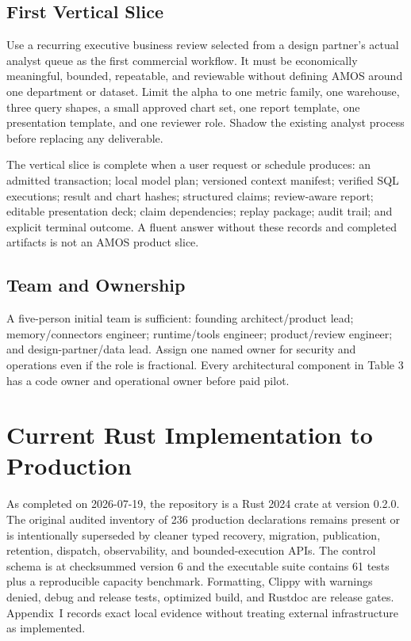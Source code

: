 \documentclass[10pt]{article}
\begin{document}
\subsection{First Vertical Slice}

Use a recurring executive business review selected from a design partner's actual analyst queue as the first commercial workflow. It must be economically meaningful, bounded, repeatable, and reviewable without defining AMOS around one department or dataset. Limit the alpha to one metric family, one warehouse, three query shapes, a small approved chart set, one report template, one presentation template, and one reviewer role. Shadow the existing analyst process before replacing any deliverable.

The vertical slice is complete when a user request or schedule produces: an admitted transaction; local model plan; versioned context manifest; verified SQL executions; result and chart hashes; structured claims; review-aware report; editable presentation deck; claim dependencies; replay package; audit trail; and explicit terminal outcome. A fluent answer without these records and completed artifacts is not an AMOS product slice.

\subsection{Team and Ownership}

A five-person initial team is sufficient: founding architect/product lead; memory/connectors engineer; runtime/tools engineer; product/review engineer; and design-partner/data lead. Assign one named owner for security and operations even if the role is fractional. Every architectural component in Table 3 has a code owner and operational owner before paid pilot.

\section{Current Rust Implementation to Production}

As completed on 2026-07-19, the repository is a Rust 2024 crate at version 0.2.0. The original audited inventory of 236 production declarations remains present or is intentionally superseded by cleaner typed recovery, migration, publication, retention, dispatch, observability, and bounded-execution APIs. The control schema is at checksummed version 6 and the executable suite contains 61 tests plus a reproducible capacity benchmark. Formatting, Clippy with warnings denied, debug and release tests, optimized build, and Rustdoc are release gates. Appendix~I records exact local evidence without treating external infrastructure as implemented.
\end{document}
